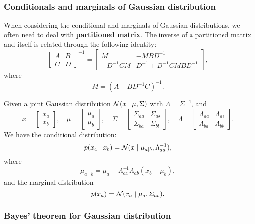 \documentclass[a4paper]{article}
\begin{document}
\subsubsection{Conditionals and marginals of Gaussian 
distribution}

When considering the conditional and marginals of Gaussian
distributions, we often need to deal with \textbf{partitioned
matrix}. The inverse of a partitioned matrix and itself 
is related through the following identity: 
\[
\begin{bmatrix}
  A & B \\
  C & D
\end{bmatrix}^{-1} 
= 
\begin{bmatrix}
  M & - M B D^{-1} \\
  - D^{-1} C M & D^{-1} + D^{-1} C M B D^{-1}
\end{bmatrix},
\]
where 
\[
M = (A - B D^{-1} C)^{-1}.
\]

\begin{thm}
Given a joint Gaussian distribution $\mathcal{N} (x \mid \mu,
\Sigma)$ with $\Lambda = \Sigma^{-1}$, and 
\[
x = \begin{bmatrix}
  x_a \\
  x_b
\end{bmatrix}, 
\quad 
\mu = \begin{bmatrix}
  \mu_a \\
  \mu_b
\end{bmatrix}, 
\quad 
\Sigma = \begin{bmatrix}
  \Sigma_{aa} & \Sigma_{ab} \\
  \Sigma_{ba} & \Sigma_{bb}
\end{bmatrix}, 
\quad 
\Lambda = \begin{bmatrix}
  \Lambda_{aa} & \Lambda_{ab} \\
  \Lambda_{ba} & \Lambda_{bb}
\end{bmatrix}.
\]
We have the conditional distribution: 
\[
p(x_a \mid x_b) 
= \mathcal{N} (x \mid \mu_{a \mid b}, \Lambda_{aa}^{-1}),
\]
where 
\[
\mu_{a \mid b} = \mu_a - \Lambda_{aa}^{-1} \Lambda_{ab} 
(x_b - \mu_b),
\]
and the marginal distribution 
\[
p(x_a) = \mathcal{N}(x_a \mid \mu_a, \Sigma_{aa}).
\] 
\end{thm}

\subsubsection{Bayes' theorem for Gaussian distribution}
\end{document}
